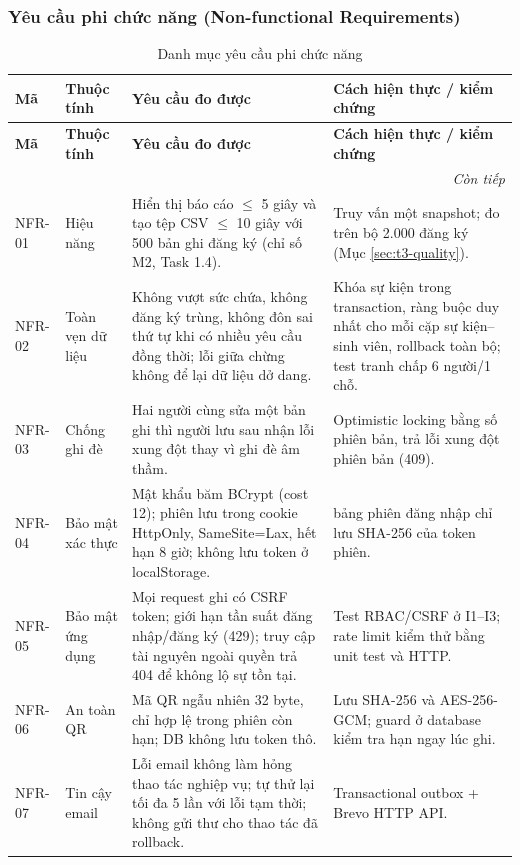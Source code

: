 \subsubsection{Yêu cầu phi chức năng (Non-functional Requirements)}

\begingroup\small
\renewcommand{\arraystretch}{1.15}
\begin{longtable}{@{}p{.08\linewidth}p{.14\linewidth}p{.44\linewidth}p{.25\linewidth}@{}}
\caption{Danh mục yêu cầu phi chức năng}\label{tab:t3-nfr}\\
\toprule
\textbf{Mã} & \textbf{Thuộc tính} & \textbf{Yêu cầu đo được} & \textbf{Cách hiện thực / kiểm chứng}\\\midrule\endfirsthead
\toprule
\textbf{Mã} & \textbf{Thuộc tính} & \textbf{Yêu cầu đo được} & \textbf{Cách hiện thực / kiểm chứng}\\\midrule\endhead
\midrule\multicolumn{4}{r}{\textit{Còn tiếp}}\\\endfoot
\bottomrule\endlastfoot
NFR-01 & Hiệu năng & Hiển thị báo cáo $\le$ 5 giây và tạo tệp CSV $\le$ 10 giây với 500 bản ghi đăng ký (chỉ số M2, Task 1.4). & Truy vấn một snapshot; đo trên bộ 2.000 đăng ký (Mục \ref{sec:t3-quality}).\\
NFR-02 & Toàn vẹn dữ liệu & Không vượt sức chứa, không đăng ký trùng, không đôn sai thứ tự khi có nhiều yêu cầu đồng thời; lỗi giữa chừng không để lại dữ liệu dở dang. & Khóa sự kiện trong transaction, ràng buộc duy nhất cho mỗi cặp sự kiện--sinh viên, rollback toàn bộ; test tranh chấp 6 người/1 chỗ.\\
NFR-03 & Chống ghi đè & Hai người cùng sửa một bản ghi thì người lưu sau nhận lỗi xung đột thay vì ghi đè âm thầm. & Optimistic locking bằng số phiên bản, trả lỗi xung đột phiên bản (409).\\
NFR-04 & Bảo mật xác thực & Mật khẩu băm BCrypt (cost 12); phiên lưu trong cookie HttpOnly, SameSite=Lax, hết hạn 8 giờ; không lưu token ở localStorage. & bảng phiên đăng nhập chỉ lưu SHA-256 của token phiên.\\
NFR-05 & Bảo mật ứng dụng & Mọi request ghi có CSRF token; giới hạn tần suất đăng nhập/đăng ký (429); truy cập tài nguyên ngoài quyền trả 404 để không lộ sự tồn tại. & Test RBAC/CSRF ở I1--I3; rate limit kiểm thử bằng unit test và HTTP.\\
NFR-06 & An toàn QR & Mã QR ngẫu nhiên 32 byte, chỉ hợp lệ trong phiên còn hạn; DB không lưu token thô. & Lưu SHA-256 và AES-256-GCM; guard ở database kiểm tra hạn ngay lúc ghi.\\
NFR-07 & Tin cậy email & Lỗi email không làm hỏng thao tác nghiệp vụ; tự thử lại tối đa 5 lần với lỗi tạm thời; không gửi thư cho thao tác đã rollback. & Transactional outbox + Brevo HTTP API.\\

\end{longtable}
